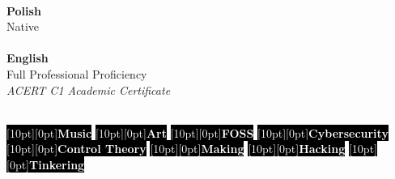 \documentclass[9pt]{./src/packages/Developer_CV/developercv}
\begin{document}
\begin{minipage}[t]{0.5\textwidth}
    \\
    \textbf{Polish}\\Native\\ \\
    \textbf{English}\\Full Professional Proficiency \\
    \textit{ACERT C1 Academic Certificate}
\end{minipage}
\hfill
\begin{minipage}[t]{0.5\textwidth}
    \raggedright %
    \\
    \colorbox{black}{\textcolor{white}{\raisebox{0.5ex}[10pt][0pt]{\textbf{Music}}}}
    \colorbox{black}{\textcolor{white}{\raisebox{0.5ex}[10pt][0pt]{\textbf{Art}}}}
    \colorbox{black}{\textcolor{white}{\raisebox{0.5ex}[10pt][0pt]{\textbf{FOSS}}}}
    \colorbox{black}{\textcolor{white}{\raisebox{0.5ex}[10pt][0pt]{\textbf{Cybersecurity}}}}
    \colorbox{black}{\textcolor{white}{\raisebox{0.5ex}[10pt][0pt]{\textbf{Control Theory}}}}
    \colorbox{black}{\textcolor{white}{\raisebox{0.5ex}[10pt][0pt]{\textbf{Making}}}}
    \colorbox{black}{\textcolor{white}{\raisebox{0.5ex}[10pt][0pt]{\textbf{Hacking}}}}
    \colorbox{black}{\textcolor{white}{\raisebox{0.5ex}[10pt][0pt]{\textbf{Tinkering}}}}
\end{minipage}


\end{document}
